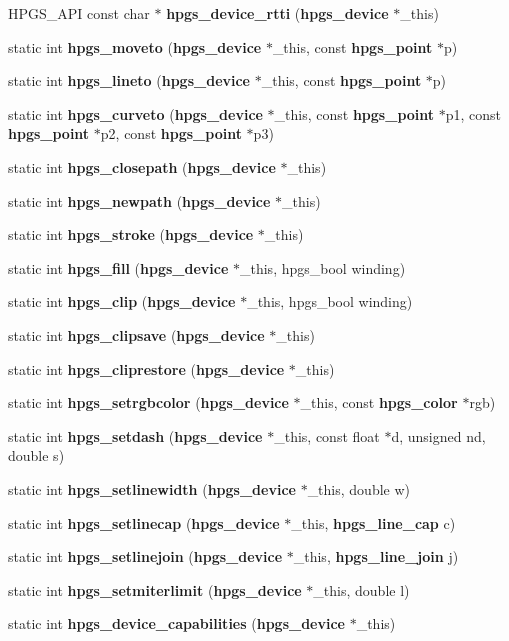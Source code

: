 \begin{DoxyCompactItemize}
\item 
HPGS\_\-API const char $\ast$ {\bf hpgs\_\-device\_\-rtti} ({\bf hpgs\_\-device} $\ast$\_\-this)
\item 
static int {\bf hpgs\_\-moveto} ({\bf hpgs\_\-device} $\ast$\_\-this, const {\bf hpgs\_\-point} $\ast$p)
\item 
static int {\bf hpgs\_\-lineto} ({\bf hpgs\_\-device} $\ast$\_\-this, const {\bf hpgs\_\-point} $\ast$p)
\item 
static int {\bf hpgs\_\-curveto} ({\bf hpgs\_\-device} $\ast$\_\-this, const {\bf hpgs\_\-point} $\ast$p1, const {\bf hpgs\_\-point} $\ast$p2, const {\bf hpgs\_\-point} $\ast$p3)
\item 
static int {\bf hpgs\_\-closepath} ({\bf hpgs\_\-device} $\ast$\_\-this)
\item 
static int {\bf hpgs\_\-newpath} ({\bf hpgs\_\-device} $\ast$\_\-this)
\item 
static int {\bf hpgs\_\-stroke} ({\bf hpgs\_\-device} $\ast$\_\-this)
\item 
static int {\bf hpgs\_\-fill} ({\bf hpgs\_\-device} $\ast$\_\-this, hpgs\_\-bool winding)
\item 
static int {\bf hpgs\_\-clip} ({\bf hpgs\_\-device} $\ast$\_\-this, hpgs\_\-bool winding)
\item 
static int {\bf hpgs\_\-clipsave} ({\bf hpgs\_\-device} $\ast$\_\-this)
\item 
static int {\bf hpgs\_\-cliprestore} ({\bf hpgs\_\-device} $\ast$\_\-this)
\item 
static int {\bf hpgs\_\-setrgbcolor} ({\bf hpgs\_\-device} $\ast$\_\-this, const {\bf hpgs\_\-color} $\ast$rgb)
\item 
static int {\bf hpgs\_\-setdash} ({\bf hpgs\_\-device} $\ast$\_\-this, const float $\ast$d, unsigned nd, double s)
\item 
static int {\bf hpgs\_\-setlinewidth} ({\bf hpgs\_\-device} $\ast$\_\-this, double w)
\item 
static int {\bf hpgs\_\-setlinecap} ({\bf hpgs\_\-device} $\ast$\_\-this, {\bf hpgs\_\-line\_\-cap} c)
\item 
static int {\bf hpgs\_\-setlinejoin} ({\bf hpgs\_\-device} $\ast$\_\-this, {\bf hpgs\_\-line\_\-join} j)
\item 
static int {\bf hpgs\_\-setmiterlimit} ({\bf hpgs\_\-device} $\ast$\_\-this, double l)
\item 
static int {\bf hpgs\_\-device\_\-capabilities} ({\bf hpgs\_\-device} $\ast$\_\-this)
\item 

\end{DoxyCompactItemize}

